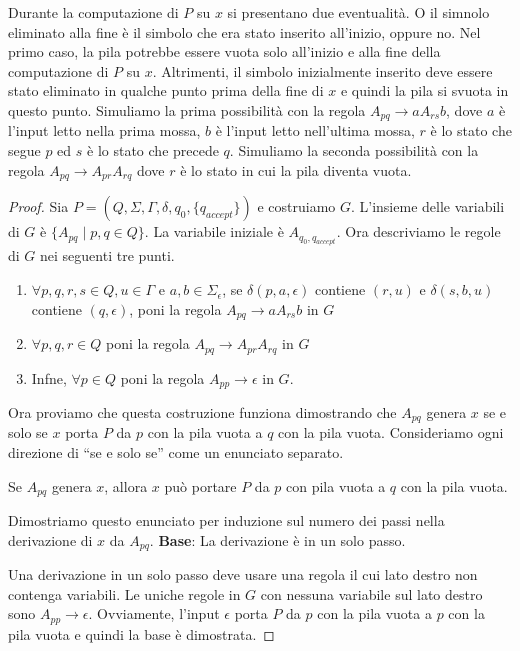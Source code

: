 \documentclass[12pt]{report}
\begin{document}
Durante la computazione di $P$ su $x$ si presentano due eventualità. O il simnolo eliminato alla fine è il simbolo che era stato inserito all'inizio, oppure no. Nel primo caso, la pila potrebbe essere vuota solo all'inizio e alla fine della computazione di $P$ su $x$. Altrimenti, il simbolo inizialmente inserito deve essere stato eliminato in qualche punto prima della fine di $x$ e quindi la pila si svuota in questo punto. Simuliamo la prima possibilità con la regola $A_{pq} \to aA_{rs}b$, dove $a$ è l'input letto nella prima mossa, $b$ è l'input letto nell'ultima mossa, $r$ è lo stato che segue $p$ ed $s$ è lo stato che precede $q$. Simuliamo la seconda possibilità con la regola $A_{pq} \to A_{pr}A_{rq}$ dove $r$ è lo stato in cui la pila diventa vuota.
\begin{proof}
	Sia $P = (Q, \Sigma, \Gamma, \delta, q_0, \{q_{accept}\})$ e costruiamo $G$. L'insieme delle variabili di $G$ è $\{A_{pq} \mid p, q \in Q\}$. La variabile iniziale è  $A_{q_0, q_{accept}}$. Ora descriviamo le regole di $G$ nei seguenti tre punti.
	\begin{enumerate}
		\item $\forall p, q, r, s \in Q, u \in \Gamma$ e $a, b \in \Sigma_\epsilon$, se $\delta(p, a, \epsilon)$ contiene $(r, u)$ e $\delta(s, b, u)$ contiene $(q, \epsilon)$, poni la regola $A_{pq} \to aA_{rs}b$ in $G$
		\item $\forall p, q, r \in Q$ poni la regola $A_{pq} \to A_{pr}A_{rq}$ in $G$
		\item Infne, $\forall p \in Q$ poni la regola $A_{pp} \to \epsilon$ in $G$.
	\end{enumerate}
	Ora proviamo che questa costruzione funziona dimostrando che $A_{pq}$ genera $x$ se e solo se $x$ porta $P$ da $p$ con la pila vuota a $q$ con la pila vuota. Consideriamo ogni direzione di ``se e solo se'' come un enunciato separato.
	\begin{proposition}{}{}
		Se $A_{pq}$ genera $x$, allora $x$ può portare $P$ da $p$ con pila vuota a  $q$ con la pila vuota.
	\end{proposition}
	Dimostriamo questo enunciato per induzione sul numero dei passi nella derivazione di $x$ da $A_{pq}$.
	\textbf{Base}: La derivazione è in un solo passo.

	Una derivazione in un solo passo deve usare una regola il cui lato destro non contenga variabili. Le uniche regole in $G$ con nessuna variabile sul lato destro sono $A_{pp} \to \epsilon$. Ovviamente, l'input $\epsilon$ porta $P$ da $p$ con la pila vuota a $p$ con la pila vuota e quindi la base è dimostrata.


\end{proof}
\end{document}
